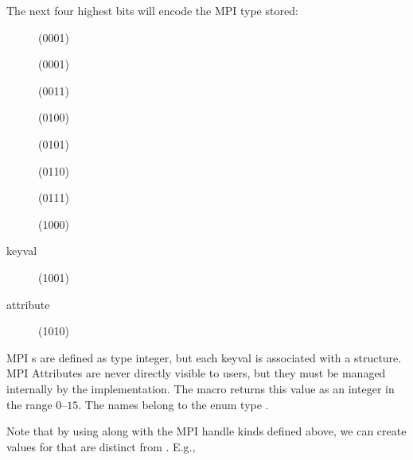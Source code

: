 \documentclass{article}
\begin{document}
The next four highest bits will encode the MPI type stored:
\begin{description}
\item[]     (0001) 
\item[]    (0001) 
\item[] (0011) 
\item[]     (0100) 
\item[](0101) 
\item[]       (0110) 
\item[]     (0111) 
\item[]      (1000) 
\item[keyval]              (1001) 
\item[attribute]           (1010) 
\end{description}
MPI s are defined as type integer, but each keyval is associated
with a structure.  MPI Attributes are never directly visible to users,
but they must be managed internally by the implementation.
The macro  returns this value as an integer in
the range $0$--$15$.  The names belong to the enum type
. 

Note that by using  along with the MPI handle
kinds defined above, we can create values for  that
are distinct from .  E.g., 
\begin{description}
\item[]       
\item[]      
\item[]   
\item[]       
\item[] 
\item[]         
\item[]       
\item[]        
\item[]  
\end{description}
\end{document}
